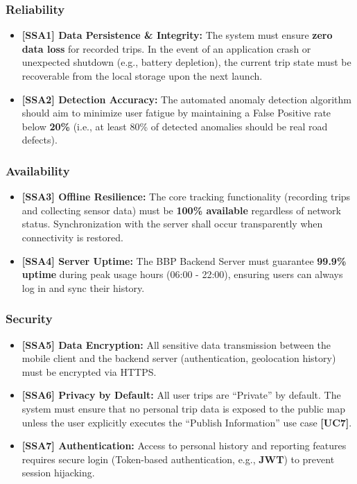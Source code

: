 \subsubsection{Reliability}
\begin{itemize}
    \item \textbf{[SSA1] Data Persistence \& Integrity:} The system must ensure \textbf{zero data loss} for recorded trips. In the event of an application crash or unexpected shutdown (e.g., battery depletion), the current trip state must be recoverable from the local storage upon the next launch.
    \item \textbf{[SSA2] Detection Accuracy:} The automated anomaly detection algorithm should aim to minimize user fatigue by maintaining a False Positive rate below \textbf{20\%} (i.e., at least 80\% of detected anomalies should be real road defects).
\end{itemize}

\subsubsection{Availability}
\begin{itemize}
    \item \textbf{[SSA3] Offline Resilience:} The core tracking functionality (recording trips and collecting sensor data) must be \textbf{100\% available} regardless of network status. Synchronization with the server shall occur transparently when connectivity is restored.
    \item \textbf{[SSA4] Server Uptime:} The BBP Backend Server must guarantee \textbf{99.9\% uptime} during peak usage hours (06:00 - 22:00), ensuring users can always log in and sync their history.
\end{itemize}

\subsubsection{Security}
\begin{itemize}
    \item \textbf{[SSA5] Data Encryption:} All sensitive data transmission between the mobile client and the backend server (authentication, geolocation history) must be encrypted via HTTPS.
    \item \textbf{[SSA6] Privacy by Default:} All user trips are ``Private'' by default. The system must ensure that no personal trip data is exposed to the public map unless the user explicitly executes the ``Publish Information'' use case \textbf{[UC7]}.
    \item \textbf{[SSA7] Authentication:} Access to personal history and reporting features requires secure login (Token-based authentication, e.g., \textbf{JWT}) to prevent session hijacking.
\end{itemize}


